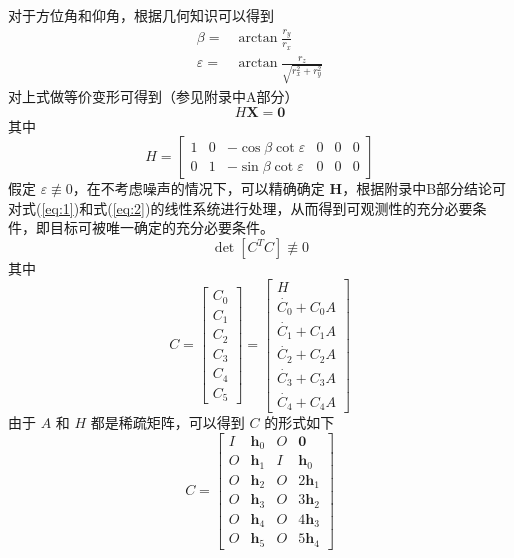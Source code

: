 对于方位角和仰角，根据几何知识可以得到
\begin{equation}
	\begin{split}
		\beta =& \arctan \frac{r_y}{r_x} \\
		\varepsilon =& \arctan \frac{r_z}{\sqrt{r_x^2 + r_y^2}}
	\end{split}
\end{equation}
对上式做等价变形可得到（参见附录中A部分）
\begin{equation}
	H\bm{X}=\bm{0} \label{eq:2}
\end{equation}
其中
\begin{equation*}
	H = \left[\begin{array}{cccccc}
		1 & 0 & -\cos\beta\cot\varepsilon & 0 & 0 & 0\\
		0 & 1 & -\sin\beta\cot\varepsilon & 0 & 0 & 0
	\end{array}\right]
\end{equation*}
假定 $\varepsilon \not \equiv 0$，在不考虑噪声的情况下，可以精确确定 $\bm{H}$，根据附录中B部分结论可对式(\ref{eq:1})和式(\ref{eq:2})的线性系统进行处理，从而得到可观测性的充分必要条件，即目标可被唯一确定的充分必要条件。
\begin{equation}
	\det[C^TC] \not \equiv 0
\end{equation}
其中
\begin{equation}
	C = \left[\begin{array}{c}
		C_0 \\ \hline
		C_1 \\ \hline
		C_2 \\ \hline
		C_3 \\ \hline
		C_4 \\ \hline
		C_5 
	\end{array}\right] 
	= \left[\begin{array}{c}
		H \\ \hline
		\dot{C_0} + C_0 A \\ \hline
		\dot{C_1} + C_1 A \\ \hline
		\dot{C_2} + C_2 A \\ \hline
		\dot{C_3} + C_3 A \\ \hline
		\dot{C_4} + C_4 A 
	\end{array}\right]
\end{equation}
由于 $A$ 和 $H$ 都是稀疏矩阵，可以得到 $C$ 的形式如下
\begin{equation}
	C = \left[\begin{array}{c|c|c|c}
		I & \bm{h}_0 & O & \bm{0} \\ \hline
		O & \bm{h}_1 & I & \bm{h}_0 \\ \hline
		O & \bm{h}_2 & O & 2\bm{h}_1 \\ \hline
		O & \bm{h}_3 & O & 3\bm{h}_2 \\ \hline
		O & \bm{h}_4 & O & 4\bm{h}_3 \\ \hline
		O & \bm{h}_5 & O & 5\bm{h}_4
	\end{array}\right]
\end{equation}
